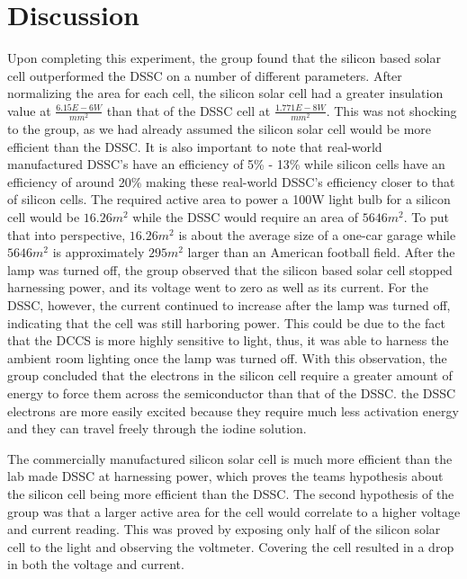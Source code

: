 \documentclass{article}
\begin{document}
\section{Discussion}
Upon completing this experiment, the group found that the silicon based solar cell outperformed the DSSC on a number of different parameters. After normalizing the area for each cell, the silicon solar cell had a greater insulation value at $\frac{6.15E-6 W}{mm^2}$ than that of the DSSC cell at $\frac{1.771E-8 W}{mm^2}$. This was not shocking to the group, as we had already assumed the silicon solar cell would be more efficient than the DSSC. It is also important to note that real-world manufactured DSSC’s have an efficiency of 5\% - 13\% while silicon cells have an efficiency of around 20\% making these real-world DSSC’s efficiency closer to that of silicon cells. The required active area to power a 100W light bulb for a silicon cell would be $16.26 m^2$ while the DSSC would require an area of $5646 m^2$. To put that into perspective, $16.26 m^2$ is about the average size of a one-car garage while $5646 m^2$ is approximately $295 m^2$ larger than an American football field. After the lamp was turned off, the group observed that the silicon based solar cell stopped harnessing power, and its voltage went to zero as well as its current. For the DSSC, however, the current continued to increase after the lamp was turned off, indicating that the cell was still harboring power. This could be due to the fact that the DCCS is more highly sensitive to light, thus, it was able to harness the ambient room lighting once the lamp was turned off. With this observation, the group concluded that the electrons in the silicon cell require a greater amount of energy to force them across the semiconductor than that of the DSSC. the DSSC electrons are more easily excited because they require much less activation energy and they can travel freely through the iodine solution.

The commercially manufactured silicon solar cell is much more efficient than the lab made DSSC at harnessing power, which proves the teams hypothesis about the silicon cell being more efficient than the DSSC. The second hypothesis of the group was that a larger active area for the cell would correlate to a higher voltage and current reading. This was proved by exposing only half of the silicon solar cell to the light and observing the voltmeter. Covering the cell resulted in a drop in both the voltage and current. 
\end{document}
